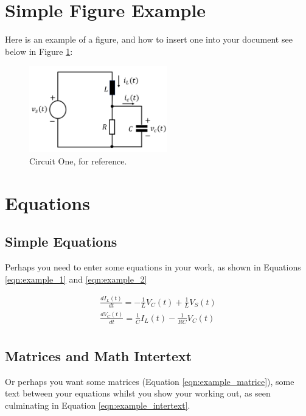 \documentclass[11pt,a4paper,normalphoto,withhyper]{altareport}
\begin{document}
\section{Simple Figure Example}
Here is an example of a figure, and how to insert one into your document see below in Figure \ref{fig:Example_Figure_Circuit}:
\begin{figure}[h]
	\centering
	\includegraphics[width=6cm]{Images/CW3_Circuit_One.png}
	\caption{Circuit One, for reference.}  %
	\label{fig:Example_Figure_Circuit}
\end{figure}




\section{Equations}
\subsection{Simple Equations}
Perhaps you need to enter some equations in your work, as shown in Equations \ref{eqn:example_1} and \ref{eqn:example_2}

\begin{gather} %
	\frac{dI_L(t)}{dt}=-\frac{1}{L}V_C(t)+\frac{1}{L}V_S(t)
	\label{eqn:example_1}\\
	\frac{dV_C(t)}{dt}=\frac{1}{C}I_L(t)-\frac{1}{RC}V_C(t)
	\label{eqn:example_2}\nonumber\\
\end{gather}


\subsection{Matrices and Math Intertext}
Or perhaps you want some matrices (Equation \ref{eqn:example_matrice}),  some text between your equations whilst you show your working out, as seen culminating in Equation \ref{eqn:example_intertext}.
\end{document}
